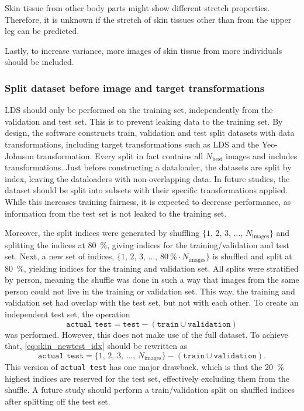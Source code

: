 Skin tissue from other body parts might show different stretch properties.
Therefore, it is unknown if the stretch of skin tissues other than from the upper leg can be predicted.

Lastly, to increase variance, more images of skin tissue from more individuals should be included.

\subsubsection{Split dataset before image and target transformations}
LDS should only be performed on the training set, independently from the validation and test set.
This is to prevent leaking data to the training set.
By design, the software constructs train, validation and test split datasets with data transformations, including target transformations such as LDS and the Yeo-Johnson transformation.
Every split in fact contains all $N_\mathrm{best}$ images and includes transformations.
Just before constructing a dataloader, the datasets are split by index, leaving the dataloaders with non-overlapping data.
In future studies, the dataset should be split into subsets with their specific transformations applied.
While this increases training fairness, it is expected to decrease performance, as information from the test set is not leaked to the training set.

Moreover, the split indices were generated by shuffling $\{1,\, 2,\, 3,\, \ldots,\, N_\mathrm{images}\}$ and splitting the indices at \qty{80}{\percent}, giving indices for the training/validation and test set.
Next, a new set of indices, $\{1,\, 2,\, 3,\, \ldots,\, \qty{80}{\percent} \cdot N_\mathrm{images}\}$ is shuffled and split at \qty{80}{\percent}, yielding indices for the training and validation set.
All splits were stratified by person, meaning the shuffle was done in such a way that images from the same person could not live in the training or validation set.
This way, the training and validation set had overlap with the test set, but not with each other.
To create an independent test set, the operation
\begin{equation}\label{eq:skin_newtest_idx}
    \texttt{actual test} = \texttt{test} - (\texttt{train} \cup \texttt{validation})
\end{equation}
was performed.
However, this does not make use of the full dataset.
To achieve that, \cref{eq:skin_newtest_idx} should be rewritten as
\begin{equation}
    \texttt{actual test} = \{1,\, 2,\, 3,\, \ldots,\, N_\mathrm{images}\} - (\texttt{train} \cup \texttt{validation}).
\end{equation}
This version of \texttt{actual test} has one major drawback, which is that the \qty{20}{\percent} highest indices are reserved for the test set, effectively excluding them from the shuffle.
A future study should perform a train/validation split on shuffled indices after splitting off the test set.

